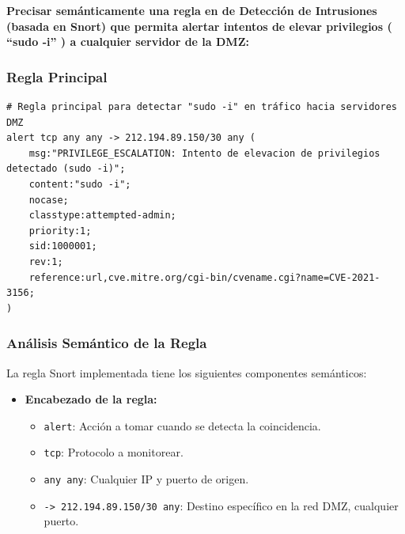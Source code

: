 {\textbf{Precisar semánticamente una regla en de Detección de Intrusiones (basada en Snort) que permita alertar intentos de elevar privilegios ( “sudo -i” ) a cualquier servidor de la DMZ:}


\subsubsection{Regla Principal}

\begin{lstlisting}[language=snort, caption=Regla Snort para detectar sudo -i]
# Regla principal para detectar "sudo -i" en tráfico hacia servidores DMZ
alert tcp any any -> 212.194.89.150/30 any (
    msg:"PRIVILEGE_ESCALATION: Intento de elevacion de privilegios detectado (sudo -i)";
    content:"sudo -i";
    nocase;
    classtype:attempted-admin;
    priority:1;
    sid:1000001;
    rev:1;
    reference:url,cve.mitre.org/cgi-bin/cvename.cgi?name=CVE-2021-3156;
)
\end{lstlisting}

\subsubsection{Análisis Semántico de la Regla}

La regla Snort implementada tiene los siguientes componentes semánticos:

\begin{itemize}
    \item \textbf{Encabezado de la regla:}
    \begin{itemize}
        \item \texttt{alert}: Acción a tomar cuando se detecta la coincidencia.
        \item \texttt{tcp}: Protocolo a monitorear.
        \item \texttt{any any}: Cualquier IP y puerto de origen.
        \item \texttt{-> 212.194.89.150/30 any}: Destino específico en la red DMZ, cualquier puerto.
    \end{itemize}
    

\end{itemize}}
